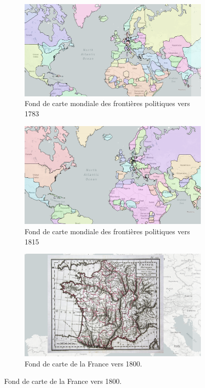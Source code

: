 \documentclass[a4paper, 12pt, twoside]{book}
\begin{document}
\begin{figure}
    \centering
    \caption{Les différents fonds de cartes disponibles}
    \label{fig:fondsCartes}
    \begin{subfigure}[b]{0.8\textwidth}
        \centering
        \includegraphics[width=1\linewidth]{img/chronotopographie/chrono_carte_1783.png}
        \caption{Fond de carte mondiale des frontières politiques vers 1783}
    \end{subfigure}
    \begin{subfigure}[b]{0.8\textwidth}
        \centering
        \includegraphics[width=1\linewidth]{img/chronotopographie/chrono_carte_1815.png}
        \caption{Fond de carte mondiale des frontières politiques vers 1815}
    \end{subfigure}
    \begin{subfigure}[b]{0.8\textwidth}
        \centering
        \includegraphics[width=1\linewidth]{img/chronotopographie/chrono_carte_france_1800.png}
        \caption{Fond de carte de la France vers 1800.}
    \end{subfigure}
    \vspace{-10pt}
\end{figure}
\end{document}
